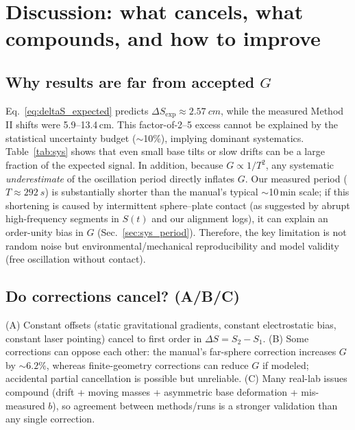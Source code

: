 \documentclass[11pt]{article}
\begin{document}
\section{Discussion: what cancels, what compounds, and how to improve}
\subsection*{Why results are far from accepted $G$}
Eq.~\eqref{eq:deltaS_expected} predicts $\Delta S_{\mathrm{exp}}\approx\SI{2.57}{cm}$, while the measured Method II shifts were 5.9--13.4\,cm.
This factor-of-2--5 excess cannot be explained by the statistical uncertainty budget ($\sim$10\%), implying dominant systematics.
Table~\ref{tab:sys} shows that even small base tilts or slow drifts can be a large fraction of the expected signal.
In addition, because $G\propto 1/T^2$, any systematic \emph{underestimate} of the oscillation period directly inflates $G$.
Our measured period ($T\approx\SI{292}{s}$) is substantially shorter than the manual's typical $\sim$10\,min scale; if this shortening is caused by intermittent sphere--plate contact (as suggested by abrupt high-frequency segments in $S(t)$ and our alignment logs), it can explain an order-unity bias in $G$ (Sec.~\ref{sec:sys_period}).
Therefore, the key limitation is not random noise but environmental/mechanical reproducibility and model validity (free oscillation without contact).

\subsection*{Do corrections cancel? (A/B/C)}
(A) Constant offsets (static gravitational gradients, constant electrostatic bias, constant laser pointing) cancel to first order in $\Delta S=S_2-S_1$.
(B) Some corrections can oppose each other: the manual's far-sphere correction increases $G$ by $\sim 6.2\%$, whereas finite-geometry corrections can reduce $G$ if modeled; accidental partial cancellation is possible but unreliable.
(C) Many real-lab issues compound (drift + moving masses + asymmetric base deformation + mis-measured $b$), so agreement between methods/runs is a stronger validation than any single correction.
\end{document}
